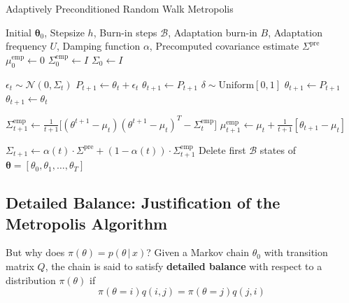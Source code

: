   \begin{algorithm}
    \caption{Adaptively Preconditioned Random Walk Metropolis}\label{alg:adaptive_precon_metro}
    \begin{algorithmic}

    \Require Initial $\boldsymbol{\theta}_0$, Stepsize $h$, Burn-in steps $\mathcal{B}$, Adaptation burn-in $B$, Adaptation frequency $U$, Damping function $\alpha$, Precomputed covariance estimate $\Sigma^{\mathrm{pre}}$
    \State $\mu_0^\mathrm{emp} \gets 0$ 
    \State $\Sigma^\mathrm{emp}_0 \gets I$
    \State $\Sigma_0 \gets I$

        \State $\epsilon_t \sim \mathcal{N}(0, \Sigma_t)$ 
        \State $P_{t+1} \gets \theta_t + \epsilon_t$
            \State $\theta_{t+1} \gets P_{t+1}$ 
        \Else
            \State $\delta \sim \mathrm{Uniform}[0, 1]$
                \State $\theta_{t+1} \gets P_{t+1}$ 
            \Else 
                \State $\theta_{t+1} \gets \theta_t$
            \EndIf
        \EndIf
        
        \State $\Sigma^\mathrm{emp}_{t+1} \gets \frac{1}{t+1} \big[(\theta^{t+1} - \mu_t) (\theta^{t+1} - \mu_t)^T - \Sigma^\mathrm{emp}_t \big]$
        \State $\mu_{t+1}^\mathrm{emp} \gets \mu_t + \frac{1}{t+1} [ \theta_{t+1} - \mu_t ]$
        
            \State $\Sigma_{t+1} \gets \alpha(t) \cdot \Sigma^\mathrm{pre} + (1 - \alpha(t)) \cdot \Sigma^\mathrm{emp}_{t+1}$
        \EndIf
    \EndFor
    \State Delete first $\mathcal{B}$ states of $\boldsymbol{\theta} = [\theta_0, \theta_1, \ldots, \theta_T]$

    \end{algorithmic}
  \end{algorithm}

\subsection{Detailed Balance: Justification of the Metropolis Algorithm}

  But why does $\pi(\theta) = p(\theta\,|\,x)$? Given a Markov chain $\theta_0$ with transition matrix $Q$, the chain is said to satisfy \textbf{detailed balance} with respect to a distribution $\pi(\theta)$ if
  \begin{equation}
    \pi(\theta = i) q(i, j) = \pi(\theta = j) q(j, i)
  \end{equation}


